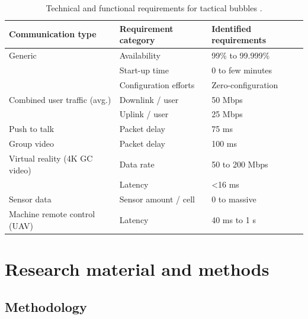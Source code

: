 \documentclass[english, 12pt, a4paper, elec, utf8, a-1b, online]{aaltothesis}
\begin{document}
\begin{table}[h]
  \centering
  \caption{Technical and functional requirements for tactical bubbles \cite{heikkila2021field}.} %
  \begin{tabular}{@{}lll@{}}
  \toprule
  Communication type            & Requirement category  & Identified requirements \\ \midrule
  Generic                       & Availability          & 99\% to 99.999\%        \\
                                & Start-up time         & 0 to few minutes        \\
                                & Configuration efforts & Zero-configuration      \\ \addlinespace[0.5em]
  Combined user traffic (avg.)  & Downlink / user       & 50 Mbps                 \\
                                & Uplink / user         & 25 Mbps                 \\ \addlinespace[0.5em]
  Push to talk                  & Packet delay          & 75 ms                   \\ \addlinespace[0.5em]
  Group video                   & Packet delay          & 100 ms                  \\ \addlinespace[0.5em]
  Virtual reality (4K GC video) & Data rate             & 50 to 200 Mbps          \\
                                & Latency               & \textless 16 ms         \\ \addlinespace[0.5em]
  Sensor data                   & Sensor amount / cell  & 0 to massive            \\ \addlinespace[0.5em]
  Machine remote control (UAV)  & Latency               & 40 ms to 1 s            \\ \bottomrule
  \end{tabular}
  \label{table-mcx-requirements}
\end{table}

\clearpage

\section{Research material and methods}

\subsection{Methodology} %
\end{document}
